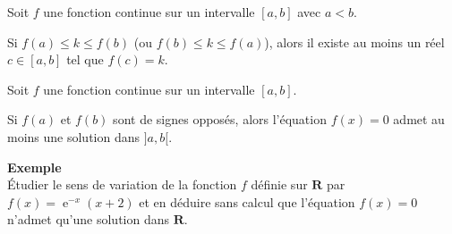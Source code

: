 \documentclass[11pt,a4paper]{article}
\DeclareMathOperator{\e}{e}
\newcommand{\cor}[1]{%
\begin{tcolorbox}[colback=red!5!white,colframe=red!75!black]
#1
\end{tcolorbox}
}
\begin{document}
\newpage

    

 \vfill 

 \cor{

Soit $f$ une fonction continue sur un intervalle $[a,b]$ avec $a < b$.

Si $f(a) \leq k \leq f(b)$ (ou $f(b) \leq k \leq f(a)$), alors il existe au moins un réel $c \in [a,b]$ tel que $f(c) = k$.
}

\vfill 

 \begin{tcolorbox}[colback=red!5!white,colframe=red!75!black]
Soit $f$ une fonction continue sur un intervalle $[a,b]$.

Si $f(a)$ et $f(b)$ sont de signes opposés, alors l'équation $f(x) = 0$ admet au moins une solution dans $]a,b[$.
\end{tcolorbox}

\vfill 

\textbf {Exemple  }\\[0.1cm]

Étudier le sens de variation de la fonction $f$ définie sur $\mathbf{R}$ par $f(x) = \e^{-x}(x+2)$ et en déduire sans 
calcul que l'équation $f(x)=0$ n'admet qu'une solution dans $\mathbf{R}$.
\end{document}
